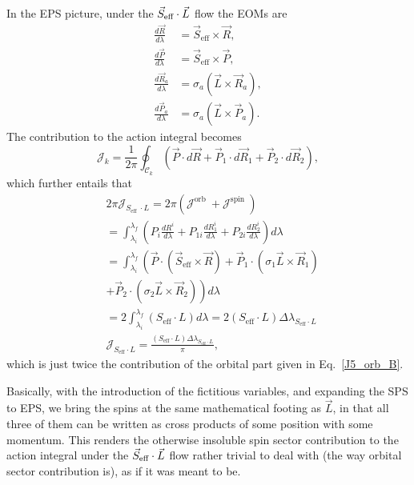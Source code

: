 In the EPS picture, under the $\vec{S}_{\text{eff}}\cdot \vec{L}$ flow the EOMs are
\begin{equation}
\begin{aligned}
\frac{d \vec{R}}{d \lambda} &=\vec{S}_{\mathrm{eff}} \times \vec{R} ,  \\
\frac{d \vec{P}}{d \lambda} &=\vec{S}_{\mathrm{eff}} \times \vec{P} , \\
\frac{d \vec{R}_{a}}{d \lambda} &=\sigma_{a}\left(\vec{L} \times \vec{R}_{a}\right) ,\\
\frac{d \vec{P}_{a}}{d \lambda} &=\sigma_{a}\left(\vec{L} \times \vec{P}_{a}\right).
\end{aligned}
\end{equation}
The contribution to the action integral becomes
\begin{equation}
\mathcal{J}_k=\frac{1}{2 \pi} \oint_{\mathcal{C}_{k}}\left(\vec{P} \cdot d \vec{R}+\vec{P}_{1} \cdot d \vec{R}_{1}+\vec{P}_{2} \cdot d \vec{R}_{2}\right),
\end{equation}
which further entails that
\begin{align}
&2 \pi \mathcal{J}_{S_{\text {eff }} \cdot L}=2 \pi\left(\mathcal{J}^{\text {orb }}+\mathcal{J}^{\text {spin }}\right)\\
&=\int_{\lambda_{i}}^{\lambda_{f}}\left(P_{i} \frac{d R^{i}}{d \lambda}+P_{1 i} \frac{d R_{1}^{i}}{d \lambda}+P_{2 i} \frac{d R_{2}^{i}}{d \lambda}\right) d \lambda\\
&=\int_{\lambda_{i}}^{\lambda_{f}}\left(\vec{P} \cdot\left(\vec{S}_{\mathrm{eff}} \times \vec{R}\right)+\vec{P}_{1} \cdot\left(\sigma_{1} \vec{L} \times \vec{R}_{1}\right)\right.\\
&\left.+\vec{P}_{2} \cdot\left(\sigma_{2} \vec{L} \times \vec{R}_{2}\right)\right) d \lambda\\
&=2 \int_{\lambda_{i}}^{\lambda_{f}}\left(S_{\mathrm{eff}} \cdot L\right) d \lambda=2\left(S_{\mathrm{eff}} \cdot L\right) \Delta \lambda_{S_{\mathrm{eff}} \cdot L}\\
&\mathcal{J}_{S_{\mathrm{eff}} \cdot L}=\frac{\left(S_{\mathrm{eff}} \cdot L\right) \Delta \lambda_{S_{\mathrm{eff}} \cdot L}}{\pi},   \label{J5_seffdl}
\end{align}
which is just twice the contribution of 
the orbital part given in Eq.~\eqref{J5_orb_B}.



\begin{tcolorbox}
Basically, with the introduction of the fictitious variables, and expanding the 
SPS to EPS, we bring the spins at the same mathematical footing as $\vec{L}$, in that
all three of them can be written as cross products of some position with some 
momentum. This renders the otherwise insoluble spin sector contribution
to the action integral under the $\vec{S}_{\text{eff}}\cdot \vec{L}$ flow rather trivial to deal with (the way
orbital sector contribution is), as if it was meant to be.
\end{tcolorbox}



